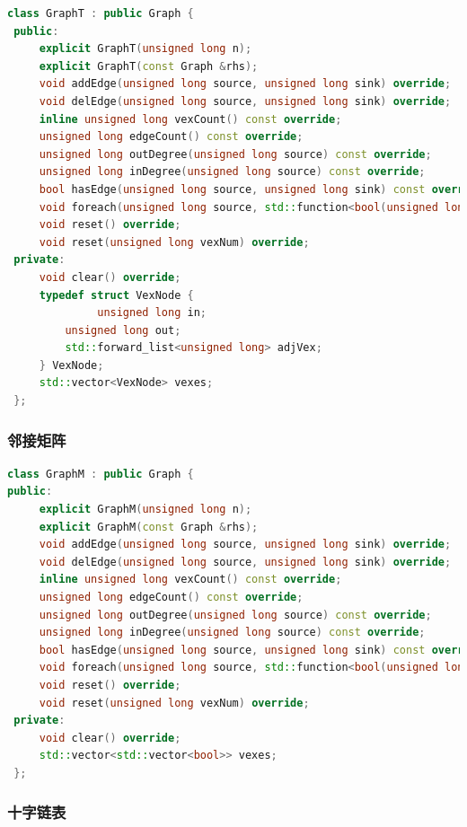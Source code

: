 \begin{lstlisting}[language = c++]
 class GraphT : public Graph {
 public:
     explicit GraphT(unsigned long n);
     explicit GraphT(const Graph &rhs);
     void addEdge(unsigned long source, unsigned long sink) override;
     void delEdge(unsigned long source, unsigned long sink) override;
     inline unsigned long vexCount() const override;
     unsigned long edgeCount() const override;
     unsigned long outDegree(unsigned long source) const override;
     unsigned long inDegree(unsigned long source) const override;
     bool hasEdge(unsigned long source, unsigned long sink) const override;
     void foreach(unsigned long source, std::function<bool(unsigned long, unsigned long)> &func) const override;
     void reset() override;
     void reset(unsigned long vexNum) override;
 private:
     void clear() override;
     typedef struct VexNode {
              unsigned long in;
         unsigned long out;
         std::forward_list<unsigned long> adjVex;
     } VexNode;
     std::vector<VexNode> vexes;
 };
\end{lstlisting}

\subsubsection{邻接矩阵}

\begin{lstlisting}[language = c++]
class GraphM : public Graph {
public:
     explicit GraphM(unsigned long n);
     explicit GraphM(const Graph &rhs);
     void addEdge(unsigned long source, unsigned long sink) override;
     void delEdge(unsigned long source, unsigned long sink) override;
     inline unsigned long vexCount() const override;
     unsigned long edgeCount() const override;
     unsigned long outDegree(unsigned long source) const override;
     unsigned long inDegree(unsigned long source) const override;
     bool hasEdge(unsigned long source, unsigned long sink) const override;
     void foreach(unsigned long source, std::function<bool(unsigned long, unsigned long)> &func) const override;
     void reset() override;
     void reset(unsigned long vexNum) override;
 private:
     void clear() override;
     std::vector<std::vector<bool>> vexes;
 };
\end{lstlisting}

\subsubsection{十字链表}

